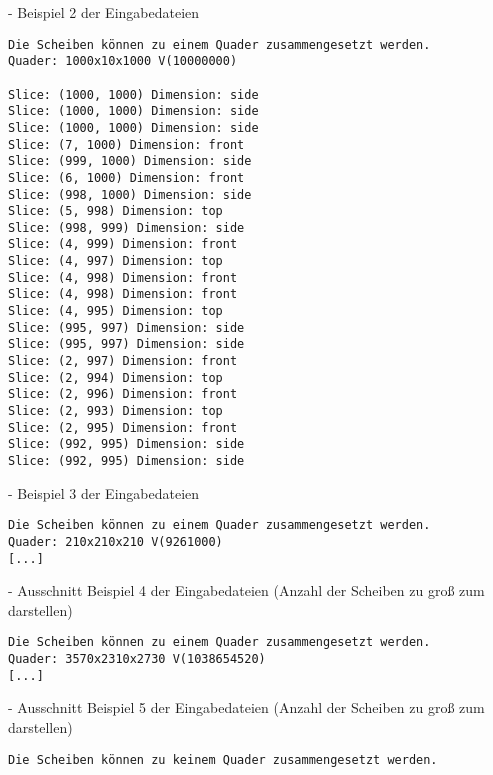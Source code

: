 \documentclass[a4paper,10pt,ngerman]{scrartcl}
\begin{document}
    - Beispiel 2 der Eingabedateien

    \newpage


    \begin{lstlisting}[frame=single, title=Programmausgabe kaese3.txt, breaklines=true,label={lst:lstlisting8}]
Die Scheiben können zu einem Quader zusammengesetzt werden.
Quader: 1000x10x1000 V(10000000)

Slice: (1000, 1000) Dimension: side
Slice: (1000, 1000) Dimension: side
Slice: (1000, 1000) Dimension: side
Slice: (7, 1000) Dimension: front
Slice: (999, 1000) Dimension: side
Slice: (6, 1000) Dimension: front
Slice: (998, 1000) Dimension: side
Slice: (5, 998) Dimension: top
Slice: (998, 999) Dimension: side
Slice: (4, 999) Dimension: front
Slice: (4, 997) Dimension: top
Slice: (4, 998) Dimension: front
Slice: (4, 998) Dimension: front
Slice: (4, 995) Dimension: top
Slice: (995, 997) Dimension: side
Slice: (995, 997) Dimension: side
Slice: (2, 997) Dimension: front
Slice: (2, 994) Dimension: top
Slice: (2, 996) Dimension: front
Slice: (2, 993) Dimension: top
Slice: (2, 995) Dimension: front
Slice: (992, 995) Dimension: side
Slice: (992, 995) Dimension: side
    \end{lstlisting}

    - Beispiel 3 der Eingabedateien

    \begin{lstlisting}[frame=single, title=Ausschnitt der Programmausgabe kaese4.txt, breaklines=true,label={lst:lstlisting9}]
Die Scheiben können zu einem Quader zusammengesetzt werden.
Quader: 210x210x210 V(9261000)
[...]
    \end{lstlisting}

    - Ausschnitt Beispiel 4 der Eingabedateien
    (Anzahl der Scheiben zu groß zum darstellen)

    \begin{lstlisting}[frame=single, title=Ausschnitt der Programmausgabe kaese5.txt, breaklines=true,label={lst:lstlisting10}]
Die Scheiben können zu einem Quader zusammengesetzt werden.
Quader: 3570x2310x2730 V(1038654520)
[...]
    \end{lstlisting}

    - Ausschnitt Beispiel 5 der Eingabedateien
    (Anzahl der Scheiben zu groß zum darstellen)

    \begin{lstlisting}[frame=single, title=Programmausgabe kaese6.txt, breaklines=true,label={lst:lstlisting11}]
Die Scheiben können zu keinem Quader zusammengesetzt werden.
    \end{lstlisting}
\end{document}
